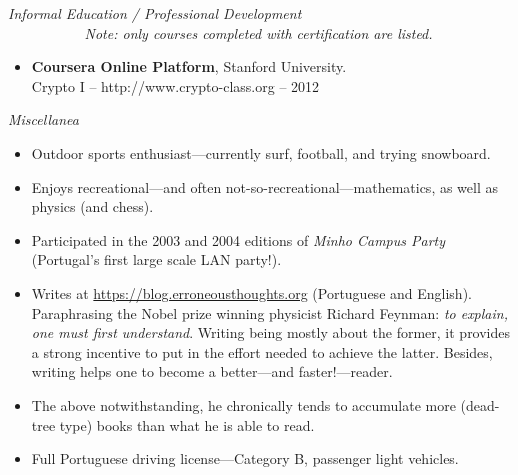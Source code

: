 \documentclass[a4paper,9pt]{extarticle}
\newenvironment{topic}[1]
   {{\noindent\large\bfseries\raisebox{0pt}[\height][1ex]{#1}\hrule}%
    \begin{list}{}{%
       \setlength{\leftmargin}{.0cm}}%
    \item[]}
   {\end{list}\medskip}
\begin{document}
\newpage   %
\begin{topic}{Additional Information}
  {\itshape Informal Education / Professional Development}\\ 
  {\slshape \small \mbox{\ \ \ \ \ \ \ \ \ \ } Note: only courses completed with certification are listed.}
  \begin{itemize}[leftmargin=*]
    \item {\bfseries Coursera Online Platform}, Stanford University.\\
      Crypto I -- http://www.crypto-class.org -- 2012
  \end{itemize}
  {\itshape Miscellanea}  
  \begin{itemize}[leftmargin=*]
    \item{Outdoor sports enthusiast---currently surf, football, and trying
      snowboard.}
    \item{Enjoys recreational---and often not-so-recreational---mathematics,
      as well as physics (and chess).}
    \item{Participated in the 2003 and 2004 editions of \emph{Minho Campus
      Party} (Portugal's first large scale LAN party!).}
    \item Writes at \url{https://blog.erroneousthoughts.org} (Portuguese and 
      English). Paraphrasing the Nobel prize winning physicist Richard Feynman: 
      \emph{to explain, one must first understand}. Writing being mostly about 
      the former, it provides a strong incentive to put in the effort needed to 
      achieve the latter. Besides, writing helps one to become a better---and 
      faster!---reader.
    \item The above notwithstanding, he chronically tends to accumulate more (dead-tree type) books than 
      what he is able to read.
    \item{Full Portuguese driving license---Category B, passenger light
      vehicles.}
  \end{itemize}
\end{topic}
\end{document}
